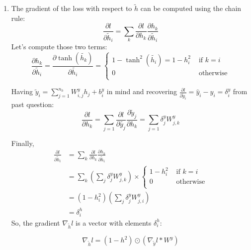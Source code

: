 \documentclass{article}
\theoremstyle{plain}%
\theoremstyle{definition}
\theoremstyle{remark}
\begin{document}
\begin{enumerate}
    \item The gradient of the loss with respect to \( \tilde{h} \) can be computed using the chain rule:
          \[
              \frac{\partial l}{\partial \tilde{h}_i} = \sum_{k}^{} \frac{\partial l}{\partial h_k} \frac{\partial h_k}{\partial \tilde{h}_i}
          \]
          Let's compute those two terms:
          \[
              \frac{\partial h_k}{\partial \tilde{h}_i} = \frac{\partial \tanh (\tilde{h_k})}{\partial \tilde{h_i}} = \begin{cases}
                  1 - \tanh^2 (\tilde{h_i}) = 1 - h_i^2 & \text{ if } k = i \\
                  0                                     & \text{ otherwise} \\
              \end{cases}
          \]

          Having $ \tilde{y}_i = \sum_{j=1}^{n_h} W_{i,j}^y h_j +b_i^y$ in mind and recovering $ \frac{\partial l}{\partial \tilde{y}_i} = \hat{y}_i - y_i = \delta ^y_i $ from past question:
          \[
              \frac{\partial l}{\partial h_k} = \sum_{j=1}^{} \frac{\partial l}{\partial \tilde{y_j}} \frac{\partial \tilde{y}_j}{\partial h_k} = \sum_{j=1}^{} \delta ^y_j W^y_{j,k}
          \]

          Finally,
          \begin{align*}
              \frac{\partial l}{\partial \tilde{h}_i} & = \sum_{k}^{} \frac{\partial l}{\partial h_k} \frac{\partial h_k}{\partial \tilde{h}_i} \\
                                                      & = \sum_{k}^{} (\sum_{j}^{} \delta ^y_j W^y_{j,k}) \times \begin{cases}
                  1 - h_i^2 & \text{ if } k = i \\
                  0         & \text{ otherwise} \\
              \end{cases}     \\
                                                      & = (1 - h_i^2) (\sum_{j}^{} \delta ^y_j W^y_{j,i})                                       \\
                                                      & = \delta ^h _i
          \end{align*}
          So, the gradient \( \nabla _{\tilde{h}} l \) is a vector with elements $ \delta ^h _i $:

          \[
              \nabla _{\tilde{h}} l = (1 - h^2) \odot (\nabla _{\tilde{y}} l * W^y)
          \]



\end{enumerate}
\end{document}
